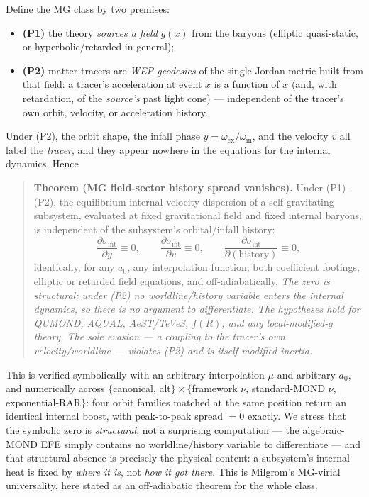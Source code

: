 \documentclass[
]{article}
\providecommand{\tightlist}{%
  \setlength{\itemsep}{0pt}\setlength{\parskip}{0pt}}
\begin{document}
Define the MG class by two premises:

\begin{itemize}
\tightlist
\item
  \textbf{(P1)} the theory \emph{sources a field} \(g(x)\) from the
  baryons (elliptic quasi-static, or hyperbolic/retarded in general);
\item
  \textbf{(P2)} matter tracers are \emph{WEP geodesics} of the single
  Jordan metric built from that field: a tracer's acceleration at event
  \(x\) is a function of \(x\) (and, with retardation, of the
  \emph{source's} past light cone) --- independent of the tracer's own
  orbit, velocity, or acceleration history.
\end{itemize}

Under (P2), the orbit shape, the infall phase
\(y=\omega_\mathrm{ex}/\omega_\mathrm{in}\), and the velocity \(v\) all label
the \emph{tracer}, and they appear nowhere in the equations for the
internal dynamics. Hence

\begin{quote}
\textbf{Theorem (MG field-sector history spread vanishes).} Under
(P1)--(P2), the equilibrium internal velocity dispersion of a
self-gravitating subsystem, evaluated at fixed gravitational field and
fixed internal baryons, is independent of the subsystem's orbital/infall
history: \[
\frac{\partial\sigma_\mathrm{int}}{\partial y}\equiv 0,\qquad \frac{\partial\sigma_\mathrm{int}}{\partial v}\equiv 0,\qquad \frac{\partial\sigma_\mathrm{int}}{\partial(\text{history})}\equiv 0,
\] identically, for any \(a_0\), any interpolation function, both
coefficient footings, elliptic or retarded field equations, and
off-adiabatically. \emph{The zero is structural: under (P2) no
worldline/history variable enters the internal dynamics, so there is no
argument to differentiate. The hypotheses hold for QUMOND, AQUAL,
AeST/TeVeS, \(f(R)\), and any local-modified-\(g\) theory. The sole
evasion --- a coupling to the tracer's own velocity/worldline ---
violates (P2) and is itself modified inertia.}
\end{quote}

This is verified symbolically with an arbitrary interpolation \(\mu\)
and arbitrary \(a_0\), and numerically across \(\{\)canonical,
alt\(\}\times\{\)framework \(\nu\), standard-MOND \(\nu\),
exponential-RAR\(\}\): four orbit families matched at the same position
return an identical internal boost, with peak-to-peak spread \(=0\)
exactly. We stress that the symbolic zero is \emph{structural}, not a
surprising computation --- the algebraic-MOND EFE simply contains no
worldline/history variable to differentiate --- and that structural
absence is precisely the physical content: a subsystem's internal heat
is fixed by \emph{where it is}, not \emph{how it got there}. This is
Milgrom's MG-virial universality, here stated as an off-adiabatic
theorem for the whole class.
\end{document}
